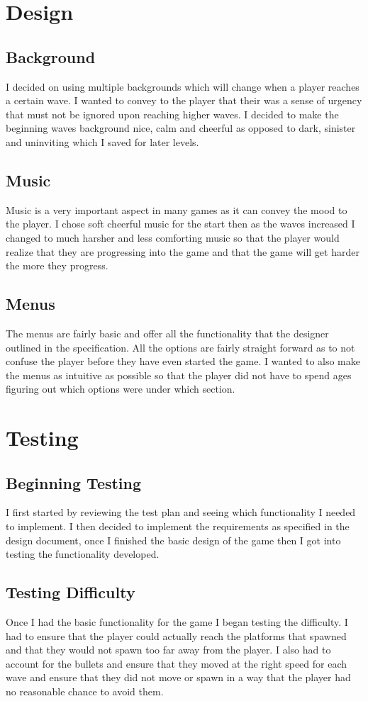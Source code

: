 \documentclass{report}
\begin{document}
\chapter{Design}
\section{Background}
I decided on using multiple backgrounds which will change when a player reaches a certain wave.  I wanted to convey to the player that their was a sense of urgency that must not be ignored upon reaching higher waves.  I decided to make the beginning waves background nice, calm and cheerful as opposed to dark, sinister and uninviting which I saved for later levels.
\section{Music}
Music is a very important aspect in many games as it can convey the mood to the player.  I chose soft cheerful music for the start then as the waves increased I changed to much harsher and less comforting music so that the player would realize that they are progressing into the game and that the game will get harder the more they progress.
\section{Menus}
The menus are fairly basic and offer all the functionality that the designer outlined in the specification.  All the options are fairly straight forward as to not confuse the player before they have even started the game.  I wanted to also make the menus as intuitive as possible so that the player did not have to spend ages figuring out which options were under which section.
\chapter{Testing}
\section{Beginning Testing}
I first started by reviewing the test plan and seeing which functionality I needed to implement. I then decided to implement the requirements as specified in the design document, once I finished the basic design of the game then I got into testing the functionality developed.
\section{Testing Difficulty}
Once I had the basic functionality for the game I began testing the difficulty.  I had to ensure that the player could actually reach the platforms that spawned and that they would not spawn too far away from the player.  I also had to account for the bullets and ensure that they moved at the right speed for each wave and ensure that they did not move or spawn in a way that the player had no reasonable chance to avoid them.
\end{document}
